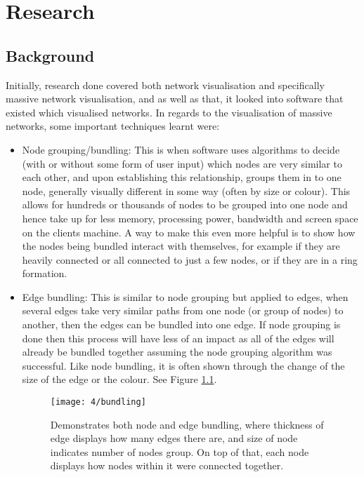 \documentclass[../dissertation.tex]{subfiles}
\begin{document}
\chapter{Research}

\section{Background}

Initially, research done covered both network visualisation and specifically massive network visualisation, and as well as that, it looked into software that existed which visualised networks. In regards to the visualisation of massive networks, some important techniques learnt were:

\begin{itemize}
    \item Node grouping/bundling: This is when software uses algorithms to decide (with or without some form of user input) which nodes are very similar to each other, and upon establishing this relationship, groups them in to one node, generally visually different in some way (often by size or colour). This allows for hundreds or thousands of nodes to be grouped into one node and hence take up for less memory, processing power, bandwidth and screen space on the clients machine. A way to make this even more helpful is to show how the nodes being bundled interact with themselves, for example if they are heavily connected or all connected to just a few nodes, or if they are in a ring formation.
    \item Edge bundling: This is similar to node grouping but applied to edges, when several edges take very similar paths from one node (or group of nodes) to another, then the edges can be bundled into one edge. If node grouping is done then this process will have less of an impact as all of the edges will already be bundled together assuming the node grouping algorithm was successful. Like node bundling, it is often shown through the change of the size of the edge or the colour. See Figure \ref{fig:bundling}.
    \begin{figure}
        \centering
        \texttt{[image: 4/bundling]}
        \caption{Demonstrates both node and edge bundling, where thickness of edge displays how many edges there are, and size of node indicates number of nodes group. On top of that, each node displays how nodes within it were connected together.}
        \label{fig:bundling}
    \end{figure}


\end{itemize}
\end{document}
